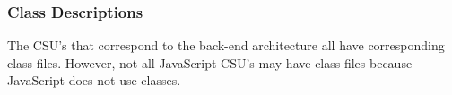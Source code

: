 \documentclass{article}
\begin{document}


\subsubsection{Class Descriptions}
\label{cd}

The CSU's that correspond to the back-end architecture all have corresponding
class files.  However, not all JavaScript CSU's may have class files because
JavaScript does not use classes.
\end{document}
